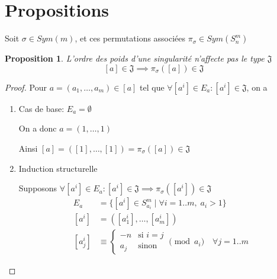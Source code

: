 \documentclass{article}
\newtheorem{proposition}{Proposition}
\begin{document}
\newpage

\section{Propositions}

Soit $\sigma \in Sym(m)$, et ces permutations associées $\pi_{\sigma} \in Sym(S_n^m)$

\begin{proposition}
    L'ordre des poids d'une singularité n'affecte pas le type $\mathfrak{J}$
    \[ [a] \in \mathfrak{J} \implies \pi_{\sigma}([a]) \in \mathfrak{J} \]
\end{proposition}

\begin{proof}
    Pour $a = (a_1, \dots, a_m) \in [a]$ tel que $\forall [a^i] \in E_a : [a^i] \in \mathfrak{J}$, on a

    \begin{enumerate}
    \item Cas de base: $E_a = \emptyset$

        On a donc $a = (1, \dots, 1)$

        Ainsi $[a] = ([1], \dots, [1]) = \pi_{\sigma}([a]) \in \mathfrak{J}$

    \item Induction structurelle

        Supposons $\forall [a^i] \in E_a : [a^i] \in \mathfrak{J} \implies \pi_{\sigma}([a^i]) \in \mathfrak{J}$
        \begin{align*}
            E_a & = \{ [a^i] \in S_{a_i}^m \mid \forall i = 1..m,\; a_i > 1 \} \\
            [a^i] & = ([a_1^i], \dots, [a_m^i]) \\
            [a_j^i] &\equiv \begin{cases}
                    -n &\text{si } i = j \\
                    a_j &\text{sinon}
                \end{cases} \pmod{a_i} \quad \forall j = 1..m
        \end{align*}


\end{enumerate}
\end{proof}
\end{document}
